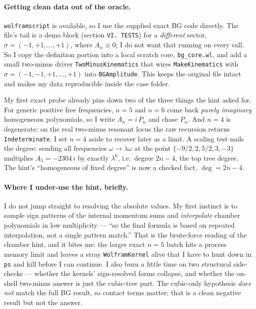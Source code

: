 \documentclass{article}
\begin{document}
\paragraph{Getting clean data out of the oracle.}
\texttt{wolframscript} is available, so I use the supplied exact BG code
directly. The file's tail is a demo block (section \texttt{VI.\ TESTS}) for a
\emph{different} sector, $\sigma=(-1,+1,\dots,+1)$, where $A_n\equiv0$; I do not
want that running on every call. So I copy the definition portion into a local
scratch core, \texttt{bg\_core.wl}, and add a small two-minus driver
\texttt{TwoMinusKinematics} that wires \texttt{MakeKinematics} with
$\sigma=(-1,-1,+1,\dots,+1)$ into \texttt{BGAmplitude}. This keeps the original
file intact and makes my data reproducible inside the case folder.

My first exact probe already pins down two of the three things the hint asked
for. For generic positive free frequencies, $n=5$ and $n=6$ come back
\emph{purely imaginary} homogeneous polynomials, so I write $A_n=i\,P_n$ and chase
$P_n$. And $n=4$ is degenerate: on the real two-minus resonant locus the raw
recursion returns \texttt{Indeterminate}. I set $n=4$ aside to recover later as a
limit. A scaling test nails the degree: sending all frequencies
$\omega\to\lambda\omega$ at the point $\{-9/2,2,5/2,3,-3\}$ multiplies
$A_5=-2304\,i$ by exactly $\lambda^6$, i.e.\ degree $2n-4$, the top tree degree.
The hint's ``homogeneous of fixed degree'' is now a checked fact, $\deg=2n-4$.

\paragraph{Where I under-use the hint, briefly.}
I do not jump straight to resolving the absolute values. My first instinct is to
sample sign patterns of the internal momentum sums and \emph{interpolate} chamber
polynomials in low multiplicity --- ``so the final formula is based on repeated
interpolation, not a single pattern match.'' That is the brute-force reading of
the chamber hint, and it bites me: the larger exact $n=5$ batch hits a process
memory limit and leaves a stray \texttt{WolframKernel} alive that I have to hunt
down in \texttt{ps} and kill before I can continue. I also burn a little time on
two structural side-checks --- whether the kernels' sign-resolved forms collapse,
and whether the on-shell two-minus answer is just the cubic-tree part. The
cubic-only hypothesis \emph{does not} match the full BG result, so contact terms
matter; that is a clean negative result but not the answer.
\end{document}
